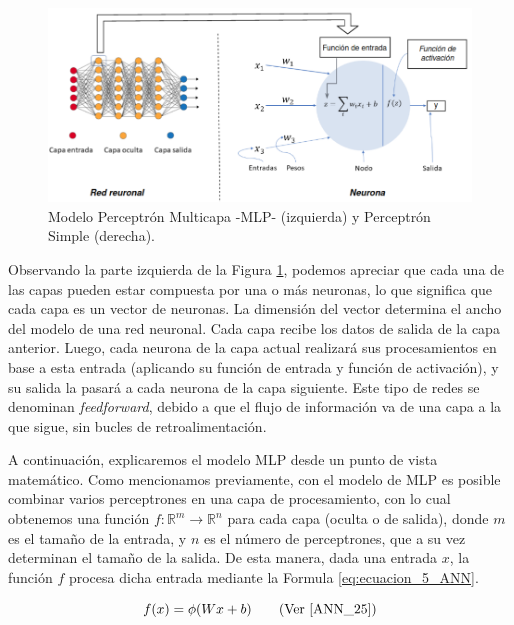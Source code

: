 \documentclass[12pt,a4paper]{article}
\begin{document}
\begin{sloppypar}
\begin{figure}[H]    %
 \centering
 \includegraphics[width=1\textwidth]{images/ANN/3-ANN.png}
 \captionsetup{justification=centering,margin=3cm}
 \caption[Modelo Perceptrón Multicapa -MLP- (izquierda) y Perceptrón Simple (derecha).]{Modelo Perceptrón Multicapa -MLP- (izquierda) y Perceptrón Simple (derecha).}
 \label{fig:ann_3}
\end{figure}

Observando la parte izquierda de la Figura \ref{fig:ann_3}, podemos apreciar que cada una de las capas pueden estar compuesta por una o más neuronas, lo que significa que cada capa es un vector de neuronas. La dimensión del vector determina el ancho del modelo de una red neuronal. Cada capa recibe los datos de salida de la capa anterior. Luego, cada neurona de la capa actual realizará sus procesamientos en base a esta entrada (aplicando su función de entrada y función de activación), y su salida la pasará a cada neurona de la capa siguiente. Este tipo de redes se denominan \textit{feedforward}, debido a que el flujo de información va de una capa a la que sigue, sin bucles de retroalimentación. 

A continuación, explicaremos el modelo MLP desde un punto de vista matemático\cite{ANN_25}. Como mencionamos previamente, con el modelo de MLP es posible combinar varios perceptrones en una capa de procesamiento, con lo cual obtenemos una función $f:\mathbb{R}^m\rightarrow \mathbb{R}^n$ para cada capa (oculta o de salida), donde $m$ es el tamaño de la entrada, y $n$ es el número de perceptrones, que a su vez determinan el tamaño de la salida. De esta manera, dada una entrada $x$, la función $f$ procesa dicha entrada mediante la Formula \ref{eq:ecuacion_5_ANN}.

\begin{equation}\label{eq:ecuacion_5_ANN}
f(x) = \phi(Wx+b) \qquad  \text{(Ver \cite{ANN_25})}
\end{equation}


\end{sloppypar}
\end{document}

